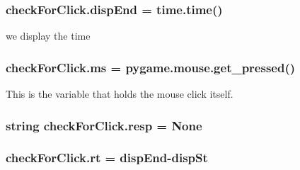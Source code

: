 \subsubsection[{\texorpdfstring{disp\+End}{dispEnd}}]{\setlength{\rightskip}{0pt plus 5cm}check\+For\+Click.\+disp\+End = time.\+time()}\hypertarget{namespacecheckForClick_a03b36bef66bab16870bb425facf34e19}{}\label{namespacecheckForClick_a03b36bef66bab16870bb425facf34e19}


we display the time 

\subsubsection[{\texorpdfstring{ms}{ms}}]{\setlength{\rightskip}{0pt plus 5cm}check\+For\+Click.\+ms = pygame.\+mouse.\+get\+\_\+pressed()}\hypertarget{namespacecheckForClick_aaa5f9fa30d3427e63fa6f462d4ef0512}{}\label{namespacecheckForClick_aaa5f9fa30d3427e63fa6f462d4ef0512}


This is the variable that holds the mouse click itself. 

\subsubsection[{\texorpdfstring{resp}{resp}}]{\setlength{\rightskip}{0pt plus 5cm}string check\+For\+Click.\+resp = None}\hypertarget{namespacecheckForClick_a8ad938c67f920c467a20df429000deab}{}\label{namespacecheckForClick_a8ad938c67f920c467a20df429000deab}
\subsubsection[{\texorpdfstring{rt}{rt}}]{\setlength{\rightskip}{0pt plus 5cm}check\+For\+Click.\+rt = {\bf disp\+End}-\/disp\+St}\hypertarget{namespacecheckForClick_afed10c5565034ea04004f801717b2897}{}\label{namespacecheckForClick_afed10c5565034ea04004f801717b2897}
